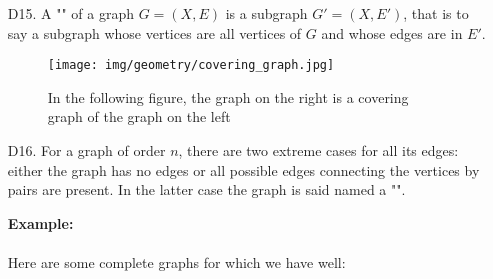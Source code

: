 {\begin{enumerate}
	Notice that every induced subgraph is also an ordinary subgraph, but not conversely. Think of a subgraph as the result of deleting some vertices and edges from the larger graph. For the subgraph to be an induced subgraph, we can still delete vertices, but now we only delete those edges that included the deleted vertices.
	
	\begin{tcolorbox}[colframe=black,colback=white,sharp corners]
	\textbf{{\Large {}}Example:}\\\\
	Consider the graphs:
	\begin{figure}[H]
		\centering
		\texttt{[image: img/geometry/subset\_graph\_induced\_graph.jpg]}
		\caption{Example of subgraphs and induced graphs}
	\end{figure}
	Here both $G_2(X_2,E_2)$ and $G_3(X_2,E_3)$ are subgraphs of $G_1(X_1,E_1)$. But only $G_2$ is an induced subgraph. Every edge in $G_1$ that connects vertices in $G_2$ is also an edge in $G_2$. In $G_3$, the edge $\{a,b\}$ is in $E_1$ but not $E_3$, even though vertices $a$ and $b$ are in $X_3$.\\
	
	The graph $G_4(X_4,E_4)$ is not a subgraph of $G_1$, even though it looks like all we did is remove vertex $e$. The reason is that in $E_4$ we have the edge $\{c,f\}$ but this is not an element of $E_1$, so we don't have the required $E_4\subseteq E_1$.
	\end{tcolorbox}
	
	\item[D15.] A "" of a graph $G=(X,E)$ is a subgraph $G'=(X,E')$, that is to say a subgraph whose vertices are all vertices of $G$ and whose edges are in $E'$.
	
	\begin{figure}[H]
		\centering
		\texttt{[image: img/geometry/covering\_graph.jpg]}
		\caption[]{In the following figure, the graph on the right is a covering graph of the graph on the left}
	\end{figure}
	
	\item[D16.] For a graph of order $n$, there are two extreme cases for all its edges: either the graph has no edges or all possible edges connecting the vertices by pairs are present. In the latter case the graph is said named a "".
	\begin{tcolorbox}[colframe=black,colback=white,sharp corners]
	\textbf{{\Large {}}Example:}\\\\
	Here are some complete graphs for which we have well:
	

\end{tcolorbox}
\end{enumerate}}
